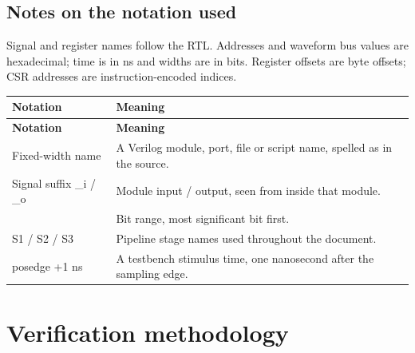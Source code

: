 \documentclass[11pt]{article}
\begin{document}
\subsection{Notes on the notation used}
\noindent Signal and register names follow the RTL. Addresses and waveform bus values are hexadecimal; time is in ns and widths are in bits. Register offsets are byte offsets; CSR addresses are instruction-encoded indices.\par\medskip
{\small
\begin{longtable}{@{}L{0.2600\dimexpr\linewidth-12pt\relax}L{0.7400\dimexpr\linewidth-12pt\relax}@{}}
\toprule
\textbf{Notation} & \textbf{Meaning} \\ \midrule
\endfirsthead
\toprule
\textbf{Notation} & \textbf{Meaning} \\ \midrule
\endhead
Fixed-width name & A Verilog module, port, file or script name, spelled as in the source. \\ \addlinespace[3pt]
Signal suffix \_i / \_o & Module input / output, seen from inside that module. \\ \addlinespace[3pt]
[a:b] & Bit range, most significant bit first. \\ \addlinespace[3pt]
S1 / S2 / S3 & Pipeline stage names used throughout the document. \\ \addlinespace[3pt]
posedge +1 ns & A testbench stimulus time, one nanosecond after the sampling edge. \\*
\bottomrule\end{longtable}}

\clearpage
\section{Verification methodology}
\end{document}
